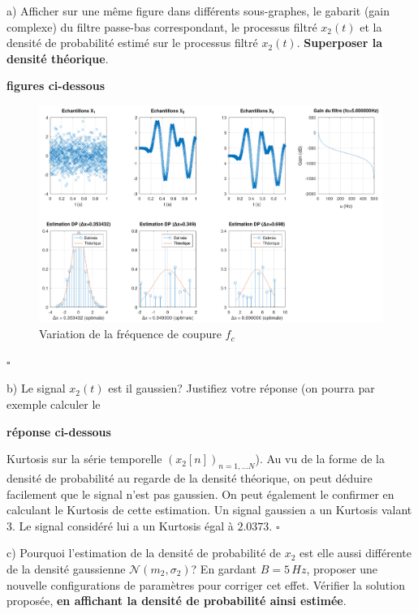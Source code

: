 \documentclass{article}
\newcommand{\debutrep}[1]{\color{blue}\begin{center} \hrulefill \textbf{ #1 } \hrulefill \end{center} }
\newcommand{\finrep}{\vspace*{5mm}\hfill $\square$\color{black}\vspace*{5mm}}
\begin{document}
\begin{list}{}{\setlength{\leftmargin}{6mm} \setlength{\labelwidth}{20mm} \setlength{\labelsep}{2mm} \setlength{\itemsep}{1mm} }

\item[a)]  Afficher  sur une même figure dans différents sous-graphes, le gabarit (gain complexe) du filtre passe-bas correspondant, le processus filtré $x_2(t)$  et la densité de probabilité estimé sur le processus filtré $x_2(t)$. \textbf{Superposer la densité théorique}.

\debutrep{figures ci-dessous}
\begin{figure} [H]
    \centering
    \includegraphics[width=1.15\columnwidth]{Bvar.png}
    \caption{Variation de la fréquence de coupure $f_c$}
\end{figure}
\finrep


\item[b)]  Le signal $x_2(t)$ est il gaussien? Justifiez votre réponse (on pourra par exemple calculer le 
\debutrep{réponse ci-dessous}
Kurtosis sur la série temporelle $\left(x_2[n]\right)_{n=1,\ldots N}$).
Au vu de la forme de la densité de probabilité au regarde de la densité théorique, on peut déduire facilement que le signal n'est pas gaussien.
On peut également le confirmer en calculant le Kurtosis de cette estimation. Un signal gaussien a un Kurtosis valant 3. Le signal considéré lui a un Kurtosis égal à $2.0373$.
\finrep

 
\item[c)] Pourquoi l'estimation de la densité de probabilité de $x_2$ est elle aussi différente de la densité gaussienne $\mathcal{N}(m_2,\sigma_2)$? En gardant  $B=5\,Hz$, proposer une nouvelle configurations de paramètres pour corriger cet effet. Vérifier la solution proposée, \textbf{en affichant la densité de probabilité ainsi estimée}.


\end{list}
\end{document}

